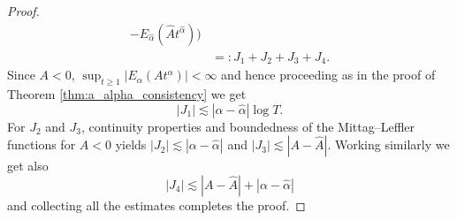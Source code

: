 \documentclass[10pt,a4paper]{amsart}
\begin{document}
\begin{proof}
\begin{align*}
	-
	E_{\hat\alpha}(\hat A t^{\hat\alpha})
	\Big) \\
    &=: J_1+J_2+J_3+J_4.
\end{align*}
Since $A<0$, $\sup_{t\geq1}
|E_\alpha(At^\alpha)|
<\infty$ and hence proceeding as in the proof of Theorem \ref{thm:a_alpha_consistency} we get
$$
|J_1|\lesssim |\alpha - \hat\alpha|\log T.
$$
For $J_2$ and $J_3$, continuity properties and boundedness of the Mittag--Leffler functions for $A<0$ yields 
$
|J_2| \lesssim |\alpha-\hat\alpha|
$
and
$
|J_3| \lesssim |A- \hat{A}|.
$
Working similarly we get also
$$
|J_4| \lesssim |A - \hat{A}|+ |\alpha - \hat\alpha|
$$
and collecting all the estimates completes the proof.




\end{proof}
\end{document}
